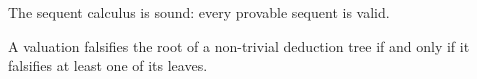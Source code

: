 \begin{page}
\setcounter{section}{2}
\setcounter{subsection}{6}
\setcounter{dfn}{15}
\label{portion:464}

\begin{thm}
\label{thm:GentzenSound}
The sequent calculus is sound: every provable sequent is valid.
\end{thm}

\end{page}

\begin{page}
\setcounter{section}{2}
\setcounter{subsection}{6}
\setcounter{dfn}{16}
\label{portion:467}

\begin{lem}
\label{lem:FalsifyRoot}
A valuation falsifies the root of a non-trivial deduction tree if and only if it falsifies at least one of its leaves.
\end{lem}

\end{page}


